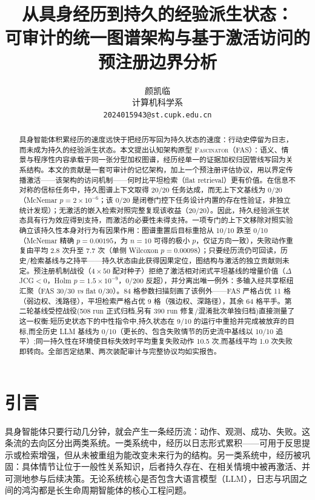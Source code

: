 \documentclass[10pt,a4paper]{ctexart}
\title{\bfseries 从具身经历到持久的经验派生状态：\\
可审计的统一图谱架构与基于激活访问的\\
预注册边界分析}
\author{颜凯临\\ \small 计算机科学系\\ \small \texttt{2024015943@st.cupk.edu.cn}}
\date{}
\begin{document}
\maketitle

\begin{abstract}
具身智能体积累经历的速度远快于把经历写回为持久状态的速度：行动史停留为日志，而未成为持久的经验派生状态。本文提出认知架构原型 \textsc{Fascinator}（FAS）：语义、情景与程序性内容承载于同一张分型加权图谱，经历经单一的证据加权归因管线写回为关系结构。本文的贡献是一套可审计的记忆架构，加上一个预注册评估协议，用以界定传播激活——该架构的访问机制——何时比平坦检索（flat retrieval）更有价值。在信息不对称的信标任务中，持久图谱上下文取得 20/20 任务达成，而无上下文基线为 0/20（McNemar $p{=}2\times10^{-6}$；该 0/20 是闭卷门控下任务设计内置的存在性验证，非独立统计发现）；无激活的嵌入检索对照完整复现该收益（20/20）。因此，持久经验派生状态具有行为效应得到支持，而激活的必要性未得支持。一项专门的上下文移除对照实验确立该持久性本身对行为有因果作用：图谱重置后目标重拾从 10/10 跌至 0/10（McNemar 精确 $p{=}0.00195$，为 $n{=}10$ 可得的极小 $p$，仅证方向一致），失败动作重复由平均 2.8 次升至 7.7 次（单侧 Wilcoxon $p{=}0.00098$）；只要经历流仍可回读，历史/检索基线与之持平——持久状态由此获得因果定位，图结构与激活的独立贡献则未定。预注册机制战役（$4\times50$ 配对种子）拒绝了激活相对闭式平坦基线的增量价值（$\Delta$JCG${<}0$，Holm $p{=}1.5\times10^{-9}$，0/200 反超），并分离出唯一例外：多输入经共享枢纽汇聚（FAS 30/30 \emph{vs} flat 0/30）。84 格参数扫描刻画了该例外——FAS 严格占优 11 格（弱边权、浅路径），平坦检索严格占优 9 格（强边权、深路径），其余 64 格平手。第二轮基线受控战役(508 run 正式归档,另有 390 run 修复/混淆批次单独归档)直接测量了这一权衡:短历史状态下的中性指令中,持久状态在 9/10 的运行中重拾并完成被放弃的目标,而全历史 LLM 基线为 0/10（更长的、包含失败情节的历史流中基线以 10/10 追平）;同一持久性在环境使目标失效时平均重复失败动作 10.5 次,而基线平均 1.0 次失败即转向。全部否定结果、两次装配审计与完整协议均如实报告。
\end{abstract}

\section{引言}
\label{sec:intro}

具身智能体只要行动几分钟，就会产生一条经历流：动作、观测、成功、失败。这条流的去向区分出两类系统。一类系统中，经历以日志形式累积——可用于反思提示或检索增强，但从未被重组为能改变未来行为的结构。另一类系统中，经历被巩固：具体情节让位于一般性关系知识，后者持久存在、在相关情境中被再激活、并可测地参与后续决策。无论系统核心是否包含大语言模型（LLM），日志与巩固之间的鸿沟都是长生命周期智能体的核心工程问题。
\end{document}
